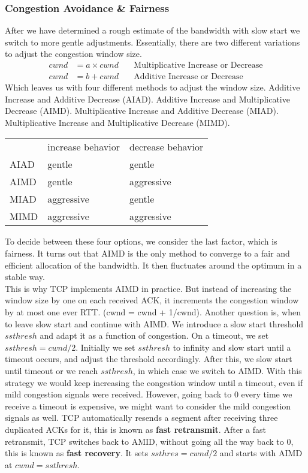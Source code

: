 \subsubsection{Congestion Avoidance \& Fairness}
After we have determined a rough estimate of the bandwidth with slow start we switch to more gentle adjustments. Essentially, there are two different variations to adjust the congestion window size. 
\begin{align*}
cwnd &= a \times cwnd \quad & \text{Multiplicative Increase or Decrease} \\
cwnd &= b + cwnd \quad & \text{Additive Increase or Decrease} 
\end{align*}
Which leaves us with four different methods to adjust the window size. Additive Increase and Additive Decrease (AIAD). Additive Increase and Multiplicative Decrease (AIMD). Multiplicative Increase and Additive Decrease (MIAD). Multiplicative Increase and Multiplicative Decrease (MIMD).
\begin{table}[]
\centering
\begin{tabular}{lll}
& {\color{gray} increase behavior} & {\color{gray} decrease behavior} \\
{\color{gray} AIAD} & gentle & gentle \\
{\color{gray} AIMD} & gentle & aggressive \\
{\color{gray} MIAD} & aggressive & gentle \\
{\color{gray} MIMD} & aggressive & aggressive
\end{tabular}
\end{table}
To decide between these four options, we consider the last factor, which is fairness. It turns out that AIMD is the only method to converge to a fair and efficient allocation of the bandwidth. It then fluctuates around the optimum in a stable way. \vspace{.3cm}\\

This is why TCP implements AIMD in practice. But instead of increasing the window size by one on each received ACK, it increments the congestion window by at most one ever RTT. (cwnd = cwnd + 1/cwnd). 
Another question is, when to leave slow start and continue with AIMD. We introduce a slow start threshold $ssthresh$ and adapt it as a function of congestion. On a timeout, we set $ssthresh = cwnd/2$. Initially we set $ssthresh$ to infinity and slow start until a timeout occurs, and adjust the threshold accordingly. After this, we slow start until timeout or we reach $ssthresh$, in which case we switch to AIMD. With this strategy we would keep increasing the congestion window until a timeout, even if mild congestion signals were received. However, going back to 0 every time we receive a timeout is expensive, we might want to consider the mild congestion signals as well. TCP automatically resends a segment after receiving three duplicated ACKs for it, this is known as \textbf{fast retransmit}. After a fast retransmit, TCP switches back to AMID, without going all the way back to 0, this is known as \textbf{fast recovery}. It sets $ssthres = cwnd/2$ and starts with AIMD at $cwnd = ssthresh$.

